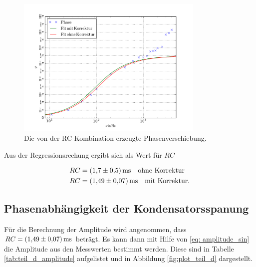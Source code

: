 \begin{figure}
  \centering
  \includegraphics[width=0.8\textwidth]{pics/frequenz_phase.pdf}
  \caption{Die von der RC-Kombination erzeugte Phasenverschiebung.}
  \label{fig:plot_teil_c}
\end{figure}


Aus der Regressionsrechung ergibt sich als Wert für $RC$

\begin{align}
  \label{eq:teil_c_rc}
  \begin{aligned}
    RC&=\SI{1.7\pm0.5}{\milli\second} \quad \text{ohne Korrektur} \\
    RC& =\SI{1.49\pm0.07}{\milli\second} \quad \text{mit Korrektur}.
\end{aligned}
\end{align}

\subsection{Phasenabhängigkeit der Kondensatorsspanung}

Für die Berechnung der Amplitude wird angenommen, dass $RC=\SI{1.49\pm0.07}{\milli\second}$ %
beträgt. Es kann dann mit Hilfe von \eqref{eq: amplitude_sin} die Amplitude aus den Messwerten bestimmt werden. %
Diese sind in Tabelle \ref{tab:teil_d_amplitude} aufgelistet und in Abbildung \ref{fig:plot_teil_d} dargestellt.



